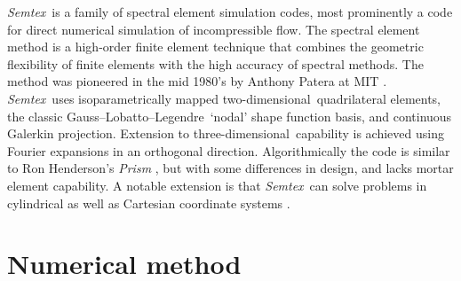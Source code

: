 \documentclass[11pt]{report}
\newcommand{\Semtex}{\emph{Semtex}} \newcommand{\Dog}{\emph{Dog}}
\newcommand\twod{two-di\-men\-sion\-al}
\newcommand\threed{three-di\-men\-sion\-al}
\newcommand\GLL{Gauss--Lobatto--Legendre}
\begin{document}
\Semtex\ is a family of spectral element simulation codes, most
prominently a code for direct numerical simulation of incompressible
flow.  The spectral element method is a high-order finite element
technique that combines the geometric flexibility of finite elements
with the high accuracy of spectral methods.  The method was pioneered
in the mid 1980's by Anthony Patera at MIT
\citep{pat84,kp86}. \Semtex\ uses isoparametrically mapped
\twod\ quadrilateral elements, the classic \GLL\ `nodal' shape
function basis, and continuous Galerkin projection. Extension to
\threed\ capability is achieved using Fourier expansions in an
orthogonal direction.  Algorithmically the code is similar to Ron
Henderson's \emph{Prism} \citep{hk95,kh98,hen99b}, but with some
differences in design, and lacks mortar element capability. A notable
extension is that \Semtex\ can solve problems in cylindrical as well
as Cartesian coordinate systems \citep{blsh04}.

\section{Numerical method}
\end{document}
